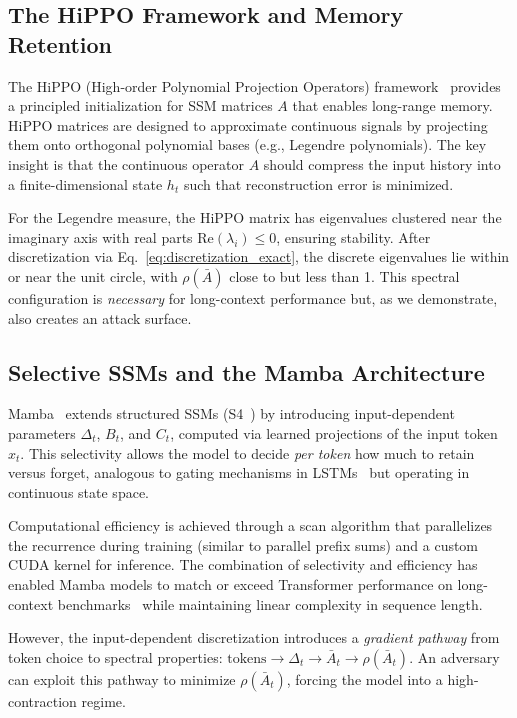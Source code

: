\documentclass[10pt,twocolumn]{article}
\begin{document}
\subsection{The HiPPO Framework and Memory Retention}

The HiPPO (High-order Polynomial Projection Operators) framework~\cite{gu2020hippo} provides a principled initialization for SSM matrices $A$ that enables long-range memory. HiPPO matrices are designed to approximate continuous signals by projecting them onto orthogonal polynomial bases (e.g., Legendre polynomials). The key insight is that the continuous operator $A$ should compress the input history into a finite-dimensional state $h_t$ such that reconstruction error is minimized.

For the Legendre measure, the HiPPO matrix has eigenvalues clustered near the imaginary axis with real parts $\text{Re}(\lambda_i) \le 0$, ensuring stability. After discretization via Eq.~\eqref{eq:discretization_exact}, the discrete eigenvalues lie within or near the unit circle, with $\rho(\bar{A})$ close to but less than 1. This spectral configuration is \emph{necessary} for long-context performance but, as we demonstrate, also creates an attack surface.

\subsection{Selective SSMs and the Mamba Architecture}

Mamba~\cite{gu2023mamba} extends structured SSMs (S4~\cite{gu2021efficiently}) by introducing input-dependent parameters $\Delta_t$, $B_t$, and $C_t$, computed via learned projections of the input token $x_t$. This selectivity allows the model to decide \emph{per token} how much to retain versus forget, analogous to gating mechanisms in LSTMs~\cite{hochreiter1997lstm} but operating in continuous state space.

Computational efficiency is achieved through a scan algorithm that parallelizes the recurrence during training (similar to parallel prefix sums) and a custom CUDA kernel for inference. The combination of selectivity and efficiency has enabled Mamba models to match or exceed Transformer performance on long-context benchmarks~\cite{poli2023hyena,dao2022hungry} while maintaining linear complexity in sequence length.

However, the input-dependent discretization introduces a \emph{gradient pathway} from token choice to spectral properties: $\text{tokens} \to \Delta_t \to \bar{A}_t \to \rho(\bar{A}_t)$. An adversary can exploit this pathway to minimize $\rho(\bar{A}_t)$, forcing the model into a high-contraction regime.
\end{document}
